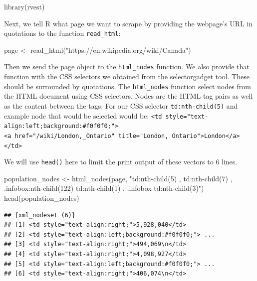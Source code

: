 \documentclass[
]{krantz}
\makeatletter
\newenvironment{Shaded}{\begin{snugshade}}{\end{snugshade}}
\newcommand{\FunctionTok}[1]{\textcolor[rgb]{0,0,0}{#1}}
\newcommand{\NormalTok}[1]{#1}
\newcommand{\OtherTok}[1]{\textcolor[rgb]{0.37,0.37,0.37}{#1}}
\newcommand{\StringTok}[1]{\textcolor[rgb]{0.5,0.5,0.5}{#1}}
\newenvironment{kframe}{%
\medskip{}
\setlength{\fboxsep}{.8em}
 \def\at@end@of@kframe{}%
 \ifinner\ifhmode%
  \def\at@end@of@kframe{\end{minipage}}%
  \begin{minipage}{\columnwidth}%
 \fi\fi%
 \def\FrameCommand##1{\hskip\@totalleftmargin \hskip-\fboxsep
 \colorbox{shadecolor}{##1}\hskip-\fboxsep
     \hskip-\linewidth \hskip-\@totalleftmargin \hskip\columnwidth}%
 \MakeFramed {\advance\hsize-\width
   \@totalleftmargin\z@ \linewidth\hsize
   \@setminipage}}%
 {\par\unskip\endMakeFramed%
 \at@end@of@kframe}
\renewenvironment{Shaded}{\begin{kframe}}{\end{kframe}}
\makeatother
\begin{document}
\begin{Shaded}
\begin{Highlighting}[]
\FunctionTok{library}\NormalTok{(rvest)}
\end{Highlighting}
\end{Shaded}

Next, we tell R what page we want to scrape by providing the webpage's URL in quotations to the function \texttt{read\_html}:

\begin{Shaded}
\begin{Highlighting}[]
\NormalTok{page }\OtherTok{\textless{}{-}} \FunctionTok{read\_html}\NormalTok{(}\StringTok{"https://en.wikipedia.org/wiki/Canada"}\NormalTok{)}
\end{Highlighting}
\end{Shaded}

Then we send the page object to the \texttt{html\_nodes} function. We also provide that function with the CSS selectors we obtained from the selectorgadget tool. These should be surrounded by quotations. The \texttt{html\_nodes} function select nodes from the HTML document using CSS selectors. Nodes are the HTML tag pairs as well as the content between the tags. For our CSS selector \texttt{td:nth-child(5)} and example node that would be selected would be: \texttt{\textless{}td\ style="text-align:left;background:\#f0f0f0;"\textgreater{}\textless{}a\ href="/wiki/London,\_Ontario"\ title="London,\ Ontario"\textgreater{}London\textless{}/a\textgreater{}\textless{}/td\textgreater{}}

We will use \texttt{head()} here to limit the print output of these vectors to 6 lines.

\begin{Shaded}
\begin{Highlighting}[]
\NormalTok{population\_nodes }\OtherTok{\textless{}{-}} \FunctionTok{html\_nodes}\NormalTok{(page, }\StringTok{"td:nth{-}child(5) , td:nth{-}child(7) , .infobox:nth{-}child(122) td:nth{-}child(1) , .infobox td:nth{-}child(3)"}\NormalTok{)}
\FunctionTok{head}\NormalTok{(population\_nodes)}
\end{Highlighting}
\end{Shaded}

\begin{verbatim}
## {xml_nodeset (6)}
## [1] <td style="text-align:right;">5,928,040</td>
## [2] <td style="text-align:left;background:#f0f0f0;"> ...
## [3] <td style="text-align:right;">494,069\n</td>
## [4] <td style="text-align:right;">4,098,927</td>
## [5] <td style="text-align:left;background:#f0f0f0;"> ...
## [6] <td style="text-align:right;">406,074\n</td>
\end{verbatim}
\end{document}
